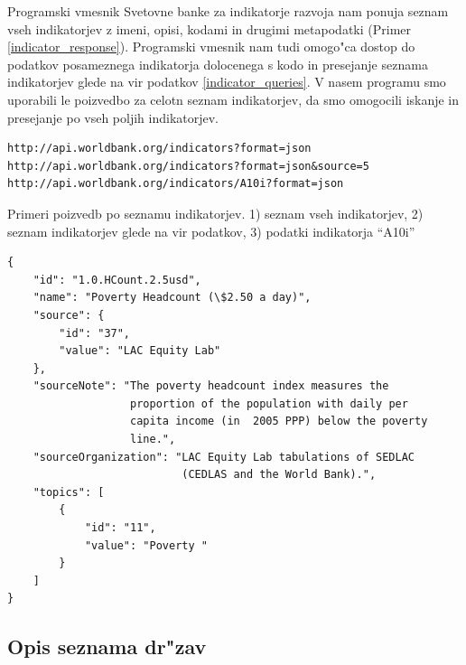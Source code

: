 Programski vmesnik Svetovne banke za indikatorje razvoja nam ponuja seznam 
vseh indikatorjev z imeni, opisi, kodami in drugimi metapodatki 
(Primer \ref{indicator_response}). Programski vmesnik nam tudi omogo"ca dostop
do podatkov posameznega indikatorja dolocenega s kodo in presejanje seznama 
indikatorjev glede na vir podatkov \ref{indicator_queries}. V nasem programu
smo uporabili le poizvedbo za celotn seznam indikatorjev, da smo omogocili 
iskanje in presejanje po vseh poljih indikatorjev.

\begin{snippet}
\begin{center}
\begin{lstlisting}
http://api.worldbank.org/indicators?format=json
http://api.worldbank.org/indicators?format=json&source=5
http://api.worldbank.org/indicators/A10i?format=json
\end{lstlisting}
\end{center}
\caption{Primeri poizvedb po seznamu indikatorjev.
1) seznam vseh indikatorjev, 2) seznam indikatorjev glede na vir podatkov,
3) podatki indikatorja ``A10i''}
\label{indicator_queries}
\end{snippet} 


\begin{snippet}
\begin{center}
\begin{lstlisting}
{
    "id": "1.0.HCount.2.5usd",
    "name": "Poverty Headcount (\$2.50 a day)",
    "source": {
        "id": "37",
        "value": "LAC Equity Lab"
    },
    "sourceNote": "The poverty headcount index measures the 
                   proportion of the population with daily per 
                   capita income (in  2005 PPP) below the poverty
                   line.",
    "sourceOrganization": "LAC Equity Lab tabulations of SEDLAC 
                           (CEDLAS and the World Bank).",
    "topics": [
        {
            "id": "11",
            "value": "Poverty "
        }
    ]
}
\end{lstlisting}
\end{center}
\caption{Podatki indikatorja 
stopnja rev"s"cine pri dohodku 2,5 dolarja na dan.}
\label{indicator_response}
\end{snippet} 

\subsection{Opis seznama dr"zav}

